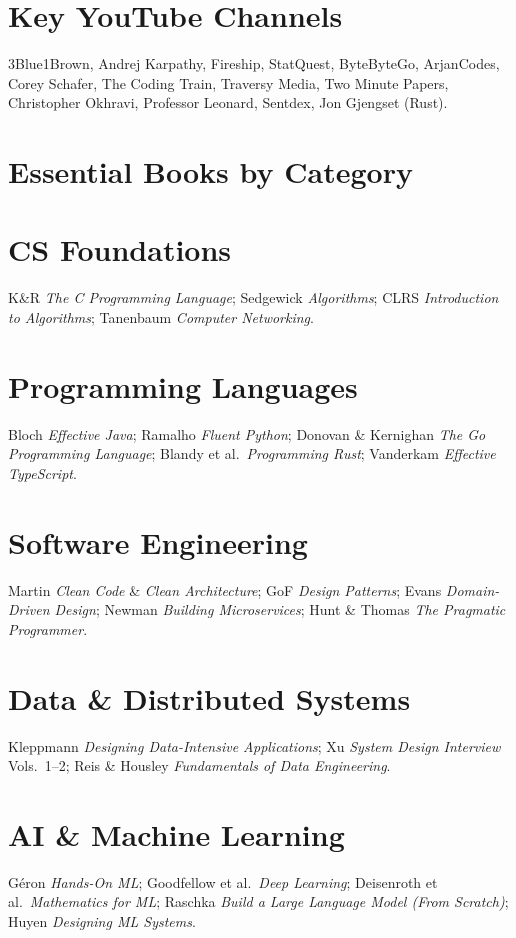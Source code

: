 \documentclass[11pt, a4paper, oneside]{report}
\begin{document}
{{{{{{{{{{{{\section*{Key YouTube Channels}

3Blue1Brown, Andrej Karpathy, Fireship, StatQuest, ByteByteGo, ArjanCodes, Corey Schafer, The Coding Train, Traversy Media, Two Minute Papers, Christopher Okhravi, Professor Leonard, Sentdex, Jon Gjengset (Rust).

\section*{Essential Books by Category}

\section*{CS Foundations}
K\&R \emph{The C Programming Language}; Sedgewick \emph{Algorithms}; CLRS \emph{Introduction to Algorithms}; Tanenbaum \emph{Computer Networking}.

\section*{Programming Languages}
Bloch \emph{Effective Java}; Ramalho \emph{Fluent Python}; Donovan \& Kernighan \emph{The Go Programming Language}; Blandy et al.\ \emph{Programming Rust}; Vanderkam \emph{Effective TypeScript}.

\section*{Software Engineering}
Martin \emph{Clean Code} \& \emph{Clean Architecture}; GoF \emph{Design Patterns}; Evans \emph{Domain-Driven Design}; Newman \emph{Building Microservices}; Hunt \& Thomas \emph{The Pragmatic Programmer}.

\section*{Data \& Distributed Systems}
Kleppmann \emph{Designing Data-Intensive Applications}; Xu \emph{System Design Interview} Vols.\ 1--2; Reis \& Housley \emph{Fundamentals of Data Engineering}.

\section*{AI \& Machine Learning}
G\'{e}ron \emph{Hands-On ML}; Goodfellow et al.\ \emph{Deep Learning}; Deisenroth et al.\ \emph{Mathematics for ML}; Raschka \emph{Build a Large Language Model (From Scratch)}; Huyen \emph{Designing ML Systems}.

}}}}}}}}}}}}
\end{document}
